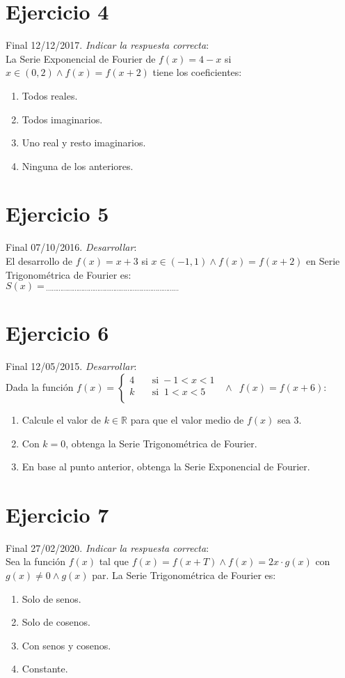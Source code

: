 \documentclass[11pt]{article}
\begin{document}
	\section{Ejercicio 4}
	Final 12/12/2017. \textit{Indicar la respuesta correcta}:\\
	La Serie Exponencial de Fourier de $f(x)=4-x$ si $x\in(0,2) \wedge f(x)=f(x+2)$ tiene los coeficientes:
	\renewcommand{\labelenumi}{\alph{enumi})}
	\begin{enumerate}
		\item Todos reales.
		\item Todos imaginarios.
		\item Uno real y resto imaginarios.
		\item Ninguna de los anteriores.
	\end{enumerate}
	\section{Ejercicio 5}
	Final 07/10/2016. \textit{Desarrollar}:\\
	El desarrollo de $f(x)=x+3$ si $x\in(-1,1)\wedge f(x)=f(x+2)$ en Serie Trigonométrica de Fourier es:\\
	$S(x)=_{\;\cdots\cdots\cdots\cdots\cdots\cdots\cdots\cdots\cdots\cdots\cdots\cdots\cdots\cdots\cdots\cdots\cdots\cdots\cdots\cdots\cdots\cdots\cdots\cdots\cdots}$
	\section{Ejercicio 6}
	Final 12/05/2015. \textit{Desarrollar}:\\
	Dada la función $   
	f(x) = 
	\begin{cases}
	4 &\quad\text{si}\;-1< x < 1\\
	k &\quad\text{si}\;\;1< x < 5 \\
	\end{cases}
	\enspace\wedge\enspace
	f(x)=f(x+6)
	$:
	\renewcommand{\labelenumi}{\alph{enumi})}
	\begin{enumerate}
		\item Calcule el valor de $k\in\mathbb{R}$ para que el valor medio de $f(x)$ sea $3$.
		\item Con $k=0$, obtenga la Serie Trigonométrica de Fourier.
		\item En base al punto anterior, obtenga la Serie Exponencial de Fourier.
	\end{enumerate}
	\section{Ejercicio 7}
	Final 27/02/2020. \textit{Indicar la respuesta correcta}:\\
	Sea la función $f(x)$ tal que $f(x)=f(x+T) \wedge f(x)=2x\cdot g(x)$ con $g(x)\neq0 \wedge g(x)$ par. La Serie Trigonométrica de Fourier es:
	\renewcommand{\labelenumi}{\alph{enumi})}
	\begin{enumerate}
		\item Solo de senos.
		\item Solo de cosenos.
		\item Con senos y cosenos.
		\item Constante.
	\end{enumerate}
\end{document}
